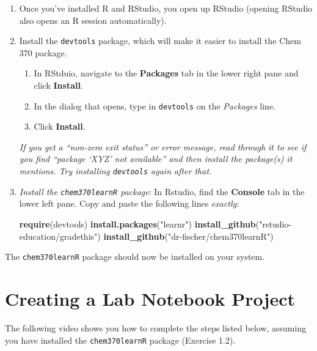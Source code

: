 \documentclass[]{tufte-book}
\newenvironment{Shaded}{}{}
\newcommand{\KeywordTok}[1]{\textcolor[rgb]{0.00,0.44,0.13}{\textbf{#1}}}
\newcommand{\NormalTok}[1]{#1}
\newcommand{\StringTok}[1]{\textcolor[rgb]{0.25,0.44,0.63}{#1}}
\providecommand{\tightlist}{%
  \setlength{\itemsep}{0pt}\setlength{\parskip}{0pt}}
\begin{document}
\begin{enumerate}
\def\labelenumi{\arabic{enumi}.}
\item
  Once you've installed R and RStudio, you open up RStudio (opening RStudio also opens an R session automatically).\\
\item
  Install the \texttt{devtools} package, which will make it easier to install the Chem 370 package.

  \begin{enumerate}
  \def\labelenumii{\arabic{enumii}.}
  \tightlist
  \item
    In RStduio, navigate to the \textbf{Packages} tab in the lower right pane and click \textbf{Install}.
  \item
    In the dialog that opens, type in \texttt{devtools} on the \emph{Packages} line.
  \item
    Click \textbf{Install}.
  \end{enumerate}

  \emph{If you get a ``non-zero exit status'' or error message, read through it to see if you find ``package `XYZ' not available'' and then install the package(s) it mentions. Try installing \texttt{devtools} again after that.}
\item
  \emph{Install the \texttt{chem370learnR} package}: In Rstudio, find the \textbf{Console} tab in the lower left pane. Copy and paste the following lines \emph{exactly}:

\begin{Shaded}
\begin{Highlighting}[]
\KeywordTok{require}\NormalTok{(devtools)}
\KeywordTok{install.packages}\NormalTok{(}\StringTok{"learnr"}\NormalTok{)}
\KeywordTok{install_github}\NormalTok{(}\StringTok{"rstudio-education/gradethis"}\NormalTok{)}
\KeywordTok{install_github}\NormalTok{(}\StringTok{"dr-fischer/chem370learnR"}\NormalTok{)}
\end{Highlighting}
\end{Shaded}
\end{enumerate}

The \texttt{chem370learnR} package should now be installed on your system.

\hypertarget{create-lab-notebook}{%
\section{Creating a Lab Notebook Project}\label{create-lab-notebook}}

The following video shows you how to complete the steps listed below, assuming you have installed the \texttt{chem370learnR} package (Exercise 1.2).
\end{document}
